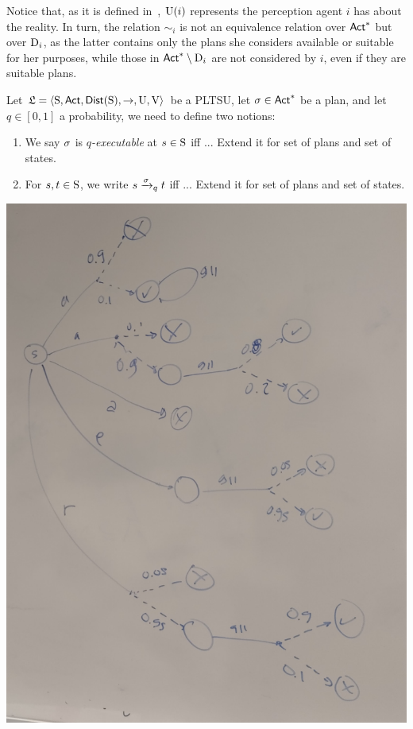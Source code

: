 Notice that, as it is defined in~\cite{AFSVQ21,AFSVQ23}, $\Unc(i)$ represents the perception agent $i$ has about the reality. In turn, the relation $\sim_i$ is not an equivalence relation over $\ACT^*$ but over $\DS{i}$, as the latter contains only the plans she considers available or suitable for her purposes, while those in $\ACT^*\setminus\DS{i}$ are not considered by $i$, even if they are suitable plans. 

\begin{definition} \label{def:executability} 
    Let  $\model=\tup{\S,\ACT,\dist(\S),\ra,\Unc,\V}$ be a PLTSU, let $\plan\in\ACT^*$ be a plan, and let $q\in[0,1]$ a probability, we need to define two notions:
    \begin{enumerate}
        \item We say $\plan$ is \emph{$q$-executable} at $s\in\S$ iff ...  Extend it for set of plans and set of states.
        \item For $s,t\in\S$, we write $s \reach{\plan}_q t$ iff ... Extend it for set of plans and set of states.
    \end{enumerate}
\end{definition}

\begin{center}
\includegraphics[scale=0.1]{PLTS.jpg}
\end{center}


